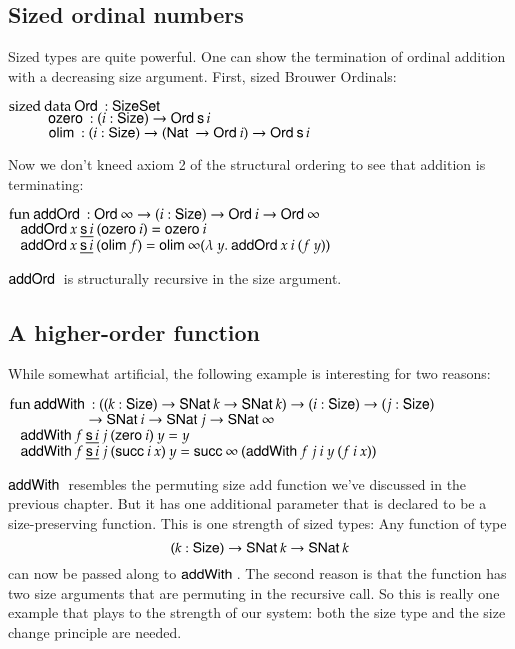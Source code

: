 \subsection{Sized ordinal numbers}
Sized types are quite powerful. 
One can show the termination of ordinal addition with a decreasing size argument.
First, sized Brouwer Ordinals:
\begin{bsp}
$\mathrm{sized}\: \mathrm{data}\: \mathsf{Ord}\: : \mathsf{Size} \mathsf{Set}$ \\
$\spcx \ozero : (i : \Size ) \ra \Ord \s i $\\
$\spcx \olim : ( i : \Size ) \ra (\Nat \ra \Ord i) \ra \Ord \s i $
\end{bsp}
Now we don't kneed axiom 2 of the structural ordering to see that addition is terminating:
\begin{bsp}
$\mathrm{fun}\: \mathsf{addOrd}\: : \mathsf{Ord}\: \infty \rightarrow ( i : \mathsf{Size} ) \rightarrow{\mathsf{Ord}\:i \rightarrow\mathsf{Ord}\:\infty }$\\
$\hspace*{3mm} \mathsf{addOrd}\: x\: \underline{\mathsf{s}\, i}\: (\mathsf{ozero}\: i) = \mathsf{ozero}\: i $\\
$\hspace*{3mm} \mathsf{addOrd}\: x\: \underline{\mathsf{s}\, i}\: (\mathsf{olim}\: f)  = \mathsf{olim}\: \infty ( \lambda\: y .\: \mathsf{addOrd}\:  x \: i \: (f \: y))  $
\end{bsp}
$\mathsf{addOrd}\:$ is structurally recursive in the size argument.
\subsection{A higher-order function}
While somewhat artificial, the following example is interesting for two reasons:
\begin{bsp}
$\mathrm{fun}\: \mathsf{addWith}\: : ((k : \mathsf{Size} ) \rightarrow \mathsf{SNat}\: k \rightarrow \mathsf{SNat}\: k ) \rightarrow (i : \mathsf{Size} ) \rightarrow (j : \mathsf{Size} ) $\\
$\spcx \spcx \ra  \SNat i \ra \SNat j \ra \SNat \infty $\\
$\hspace*{3mm} \mathsf{addWith}\: f \: \underline{\mathsf{s}\, i} \: j \: (\mathsf{zero}\: i) \: y = y $ \\
$\hspace*{3mm} \mathsf{addWith}\: f \: \underline{\mathsf{s}\, i} \: j \: (\mathsf{succ}\: i \: x) \: y = \mathsf{succ}\: \infty \: (\mathsf{addWith}\: f \: j \: i \: y \: (f \: i \: x))$
\end{bsp}
$\mathsf{addWith}\:$ resembles the permuting size add function we've discussed in the previous chapter.
But it has one additional parameter that is declared to be a size-preserving function.
This is one strength of sized types: Any function of type 
\[ (k : \mathsf{Size} ) \rightarrow \mathsf{SNat}\: k \rightarrow \mathsf{SNat}\: k \]
can now be passed along to $\mathsf{addWith}\:$.
The second reason is that the function has two size arguments that are permuting in the recursive call. 
So this is really one example that plays to the strength of our system: both the size type and the size change principle are needed.

